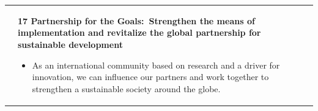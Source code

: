 \documentclass[../SustainableHEP.tex]{subfiles}
\begin{document}
\begin{longtable*}{l l}
\parbox[t]{\SDGleft\textwidth}{} & \parbox[t]{\SDGright\textwidth}{\textbf{17 Partnership for the Goals:\ Strengthen the means of implementation and revitalize the global partnership for sustainable development}
\vspace{\recskip}
\begin{itemize}[leftmargin=20pt]
\setlength{\itemsep}{\recskip}
\item As an international community based on research and a driver for innovation, we can influence our partners and work together to strengthen a sustainable society around the globe.
\end{itemize}}

\end{longtable*}
\renewcommand*{\arraystretch}{1}
\end{document}

